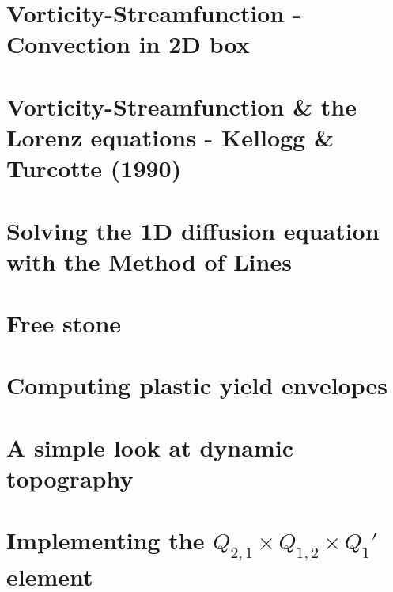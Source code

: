 \documentclass[a4paper,11pt]{report}
\begin{document}
\chapter{Vorticity-Streamfunction - Convection in 2D box \label{f155}} %

\chapter{Vorticity-Streamfunction \& the Lorenz equations - Kellogg \& Turcotte (1990)  \label{f156}} %

\chapter{Solving the 1D diffusion equation with the Method of Lines  \label{f157}} %

\chapter{Free stone \label{f158}} %

\chapter{Computing plastic yield envelopes \label{f159}} %

\chapter{A simple look at dynamic topography \label{f160}} %

\chapter{Implementing the $Q_{2,1}\times Q_{1,2} \times Q_{1}'$ element \label{f161}} %
\end{document}
